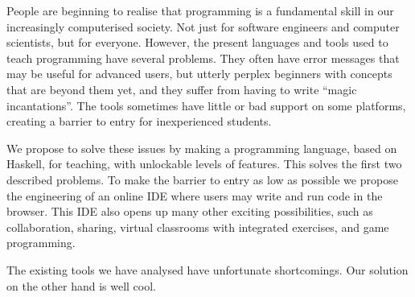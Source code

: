 People are beginning to realise that programming is a fundamental skill in our
increasingly computerised society.  Not just for software engineers and
computer scientists, but for everyone. However, the present languages and tools
used to teach programming have several problems. They often have error
messages that may be useful for advanced users, but utterly perplex beginners 
with concepts that are beyond them yet, and they suffer from having to write 
``magic incantations''. The tools sometimes have little or bad support on some 
platforms, creating a barrier to entry for inexperienced students.

We propose to solve these issues by making a programming language, based on
Haskell, for teaching, with unlockable levels of features. This solves the 
first two described problems. To make the barrier to entry as low as possible 
we propose the engineering of an online IDE where users may write and run code 
in the browser. This IDE also opens up many other exciting possibilities, such 
as collaboration, sharing, virtual classrooms with integrated exercises, and 
game programming.

The existing tools we have analysed have unfortunate shortcomings. Our 
solution on the other hand is well cool.
